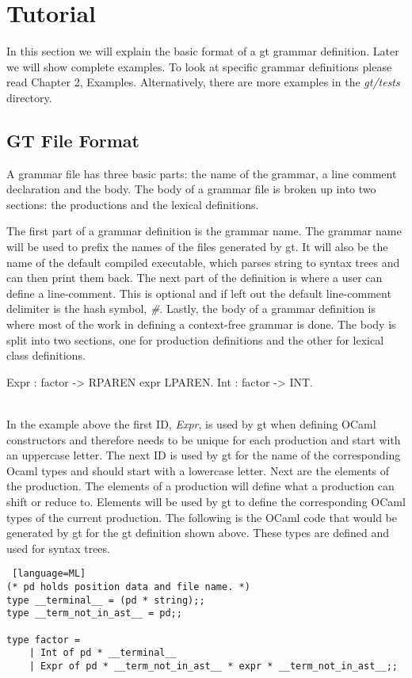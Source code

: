 \section{Tutorial}
In this section we will explain the basic format of a gt grammar definition. Later we will show complete
examples. To look at specific grammar definitions please read Chapter 2, Examples. Alternatively,
there are more examples in the \textit{gt/tests} directory.

\subsection{GT File Format}
A grammar file has three basic parts: the name of the grammar, a line comment declaration and the body. 
The body of a grammar file is broken up into two sections: the productions and the lexical definitions.

The first part of a grammar definition is the grammar name. The grammar name will be used to prefix the names
of the files generated by gt. It will also be the name of the default compiled executable, which parses string 
to syntax trees and can then print them back. The next part of the definition is where a user can define a line-comment. 
This is optional and if left out the default line-comment delimiter is the hash symbol, \textit{\#}. Lastly, the body 
of a grammar definition is where most of the work in defining a context-free grammar is done. The body is split into 
two sections, one for production definitions and the other for lexical class definitions.\\
\begin{gt}
Expr : factor -> RPAREN expr LPAREN.
Int : factor -> INT.
\end{gt}\ \\
In the example above the first ID, \textit{Expr}, is used by gt when defining OCaml constructors and therefore needs
to be unique for each production and start with an uppercase letter. The next ID is used by gt for the name of the corresponding
Ocaml types and should start with a lowercase letter. Next are the elements of the 
production. The elements of a production will define what a production can shift or reduce to. Elements
will be used by gt to define the corresponding OCaml types of the current production. The following is the OCaml
code that would be generated by gt for the gt definition shown above. These types are defined and used for syntax trees. \\
\begin{lstlisting} [language=ML]
(* pd holds position data and file name. *) 
type __terminal__ = (pd * string);;
type __term_not_in_ast__ = pd;;

type factor =  
    | Int of pd * __terminal__
    | Expr of pd * __term_not_in_ast__ * expr * __term_not_in_ast__;;
\end{lstlisting} 

